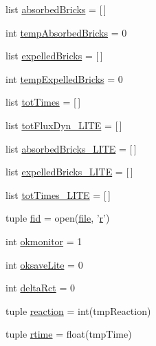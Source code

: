 \begin{DoxyCompactItemize}
list \hyperlink{namespacebuffered_flux_analysis_acd39b5831b0a3150487f722fa3941723}{absorbed\-Bricks} = \mbox{[}$\,$\mbox{]}
\item 
int \hyperlink{namespacebuffered_flux_analysis_a83acfbebbbafd68ab6574c76d2be6c60}{temp\-Absorbed\-Bricks} = 0
\item 
list \hyperlink{namespacebuffered_flux_analysis_abb64e6cc33529d672b220bca854fcc5c}{expelled\-Bricks} = \mbox{[}$\,$\mbox{]}
\item 
int \hyperlink{namespacebuffered_flux_analysis_a496cf2986cc324a0421c288991e1be93}{temp\-Expelled\-Bricks} = 0
\item 
list \hyperlink{namespacebuffered_flux_analysis_a11c5182cf16d185b8ebd807aff4eb839}{tot\-Times} = \mbox{[}$\,$\mbox{]}
\item 
list \hyperlink{namespacebuffered_flux_analysis_afc46fc569c50ea77d9dd0a6a1e9eb438}{tot\-Flux\-Dyn\-\_\-\-L\-I\-T\-E} = \mbox{[}$\,$\mbox{]}
\item 
list \hyperlink{namespacebuffered_flux_analysis_a4d8afcc76cdbe3ba251368426147cefd}{absorbed\-Bricks\-\_\-\-L\-I\-T\-E} = \mbox{[}$\,$\mbox{]}
\item 
list \hyperlink{namespacebuffered_flux_analysis_a6add3eeb2b7903c31bd378684f0ae0f7}{expelled\-Bricks\-\_\-\-L\-I\-T\-E} = \mbox{[}$\,$\mbox{]}
\item 
list \hyperlink{namespacebuffered_flux_analysis_afe01d8621771212d5e3d525f70d78090}{tot\-Times\-\_\-\-L\-I\-T\-E} = \mbox{[}$\,$\mbox{]}
\item 
tuple \hyperlink{namespacebuffered_flux_analysis_a490a31896b3a0812a6e9ed57cd4be1c9}{fid} = open(\hyperlink{inizializzatore___a_c_s_8m_ab790e1eaff8d62837eb7fe789b2b52c6}{file}, '\hyperlink{_k_s_search_launcher_8m_ac862e7284527eb913b1351c8bfb8e079}{r}')
\item 
int \hyperlink{namespacebuffered_flux_analysis_a25fb267e09b519680d3f5d767eaa526c}{okmonitor} = 1
\item 
int \hyperlink{namespacebuffered_flux_analysis_a8df8abbeab32a9f551cce00c3f8fc1b5}{oksave\-Lite} = 0
\item 
int \hyperlink{namespacebuffered_flux_analysis_ad074bf5da40fa7fb7978db66744aec56}{delta\-Rct} = 0
\item 
tuple \hyperlink{namespacebuffered_flux_analysis_ae2f3c773b4d02cc6548fa0199cd93d81}{reaction} = int(tmp\-Reaction)
\item 
tuple \hyperlink{namespacebuffered_flux_analysis_a3a242047ff630fce5bc0c36591a9b22b}{rtime} = float(tmp\-Time)
\item 

\end{DoxyCompactItemize}
